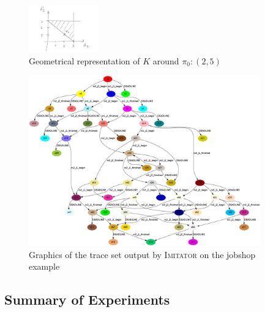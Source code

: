 \documentclass{llncs}
\newcommand{\Ko}{K}
\newcommand{\pio}{\pi_0}
\newcommand{\imitator}{\textsc{Imitator}}
\newcommand{\commentaire}[1]{\textcolor{red}{\textbf{$\Leftarrow$  #1 $\Rightarrow$}}}
\begin{document}
\begin{figure}[ht!]
	\centering
		\includegraphics[width=3cm]{geom.jpg}
	\caption{Geometrical representation of $\Ko$ around $\pio: (2,5)$}
	\label{fig:geom}
\end{figure}

\begin{figure}[ht!]
	\centering
		\includegraphics[width=10cm]{traceset.jpg}
	\caption{Graphics of the trace set output by \imitator{} on the jobshop example}
	\label{fig:output}
\end{figure}



\subsection*{Summary of Experiments}

\end{document}
